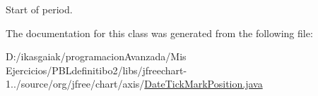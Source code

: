 Start of period. 

The documentation for this class was generated from the following file\+:\begin{DoxyCompactItemize}
\item 
D\+:/ikasgaiak/programacion\+Avanzada/\+Mis Ejercicios/\+P\+B\+Ldefinitibo2/libs/jfreechart-\/1../source/org/jfree/chart/axis/\mbox{\hyperlink{_date_tick_mark_position_8java}{Date\+Tick\+Mark\+Position.\+java}}\end{DoxyCompactItemize}
